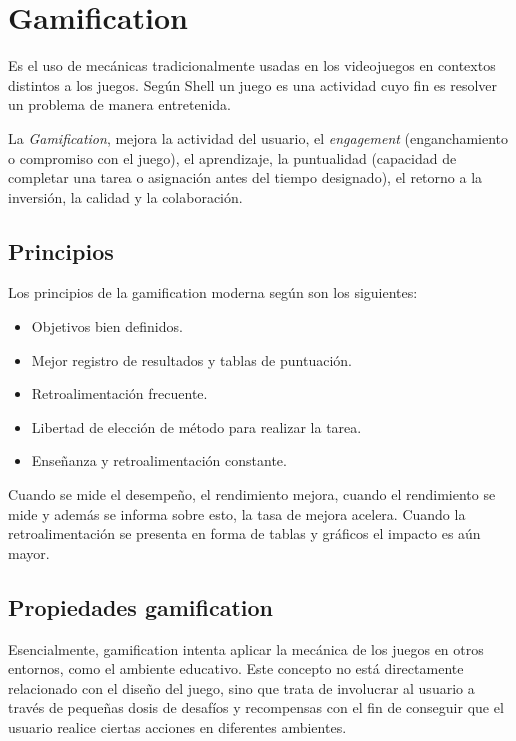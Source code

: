\section{Gamification}
\label{sec:tics_GAMIFICATION}

Es el uso de mecánicas tradicionalmente usadas en los videojuegos en contextos distintos
a los juegos. Según Shell \cite{hj:gamification} un juego es una actividad cuyo fin es resolver un problema de manera entretenida. 

La \emph{Gamification}, mejora la actividad del usuario, el \emph{engagement} (enganchamiento o compromiso con el juego), el aprendizaje, la puntualidad (capacidad de completar una tarea o asignación antes del tiempo designado), el retorno a la inversión, la calidad y la colaboración.

\subsection{Principios}

Los principios de la gamification moderna según \cite{hj:gamification} son los 
siguientes:

\begin{itemize}
\item Objetivos bien definidos.
\item Mejor registro de resultados y tablas de puntuación.
\item Retroalimentación frecuente.
\item Libertad de elección de método para realizar la tarea.
\item Enseñanza y retroalimentación constante.
\end{itemize}

Cuando se mide el desempeño, el rendimiento mejora, cuando el rendimiento se mide y además se informa sobre esto, la tasa de mejora acelera. Cuando la retroalimentación se
presenta en forma de tablas y gráficos el impacto es aún mayor.

\subsection{Propiedades gamification}

Esencialmente, gamification intenta aplicar la mecánica de los juegos en otros entornos, como el ambiente educativo. Este concepto no está directamente relacionado con el diseño del juego, sino que trata de involucrar al usuario a través de pequeñas dosis de desafíos y recompensas con el fin de conseguir que el usuario realice ciertas acciones en diferentes ambientes\cite{breaking:gamification}.

